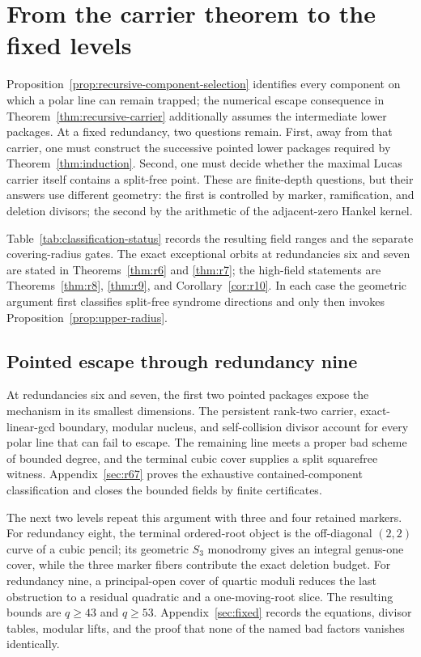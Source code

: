 \section{From the carrier theorem to the fixed levels}

Proposition~\ref{prop:recursive-component-selection} identifies every
component on which a polar line can remain trapped; the numerical escape
consequence in Theorem~\ref{thm:recursive-carrier} additionally assumes the
intermediate lower packages.  At a fixed redundancy, two questions remain.
First, away from that carrier, one must construct the successive pointed lower
packages required by Theorem~\ref{thm:induction}.  Second, one must decide
whether the maximal Lucas carrier itself contains a split-free point.  These
are finite-depth questions, but their answers use different geometry: the
first is controlled by marker, ramification, and deletion divisors; the second
by the arithmetic of the adjacent-zero Hankel kernel.

Table~\ref{tab:classification-status} records the resulting field ranges and
the separate covering-radius gates.  The exact exceptional orbits at
redundancies six and seven are stated in Theorems~\ref{thm:r6} and
\ref{thm:r7}; the high-field statements are Theorems~\ref{thm:r8},
\ref{thm:r9}, and Corollary~\ref{cor:r10}.  In each case the geometric
argument first classifies split-free syndrome directions and only then invokes
Proposition~\ref{prop:upper-radius}.

\subsection{Pointed escape through redundancy nine}

At redundancies six and seven, the first two pointed packages expose the
mechanism in its smallest dimensions.  The persistent rank-two carrier,
exact-linear-gcd boundary, modular nucleus, and self-collision divisor account
for every polar line that can fail to escape.  The remaining line meets a
proper bad scheme of bounded degree, and the terminal cubic cover supplies a
split squarefree witness.  Appendix~\ref{sec:r67} proves the exhaustive
contained-component classification and closes the bounded fields by finite
certificates.

The next two levels repeat this argument with three and four retained markers.
For redundancy eight, the terminal ordered-root object is the off-diagonal
$(2,2)$ curve of a cubic pencil; its geometric $S_3$ monodromy gives an
integral genus-one cover, while the three marker fibers contribute the exact
deletion budget.  For redundancy nine, a principal-open cover of quartic
moduli reduces the last obstruction to a residual quadratic and a
one-moving-root slice.  The resulting bounds are $q\geq43$ and $q\geq53$.
Appendix~\ref{sec:fixed} records the equations, divisor tables, modular lifts,
and the proof that none of the named bad factors vanishes identically.

